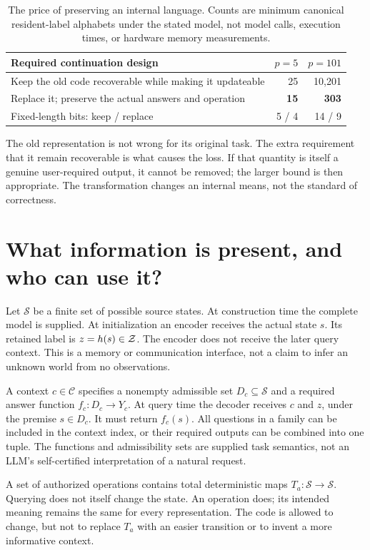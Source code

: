 \documentclass[11pt,letterpaper]{article}
\newcommand{\Sset}{\mathcal S}\newcommand{\Cset}{\mathcal C}
\theoremstyle{remark}\newtheorem{remark}{Remark}[section]
\begin{document}
\begin{table}[htbp]\centering\small
\caption{The price of preserving an internal language. Counts are minimum canonical resident-label alphabets under the stated model, not model calls, execution times, or hardware memory measurements.}\label{tab:opening}
\begin{tabularx}{\linewidth}{@{}Yrr@{}}\toprule
Required continuation design & $p=5$ & $p=101$\\\midrule
Keep the old code recoverable while making it updateable & 25 & 10,201\\
Replace it; preserve the actual answers and operation & \textbf{15} & \textbf{303}\\
Fixed-length bits: keep / replace & 5 / 4 & 14 / 9\\\bottomrule
\end{tabularx}
\end{table}

The old representation is not wrong for its original task. The extra requirement that it remain recoverable is what causes the loss. If that quantity is itself a genuine user-required output, it cannot be removed; the larger bound is then appropriate. The transformation changes an internal means, not the standard of correctness.

\section{What information is present, and who can use it?}
\label{sec:contract}
Let $\Sset$ be a finite set of possible source states. At construction time the complete model is supplied. At initialization an encoder receives the actual state $s$. Its retained label is $z=h(s)\in\mathcal Z$. The encoder does not receive the later query context. This is a memory or communication interface, not a claim to infer an unknown world from no observations.

A context $c\in\Cset$ specifies a nonempty admissible set $D_c\subseteq\Sset$ and a required answer function $f_c:D_c\to Y_c$. At query time the decoder receives $c$ and $z$, under the premise $s\in D_c$. It must return $f_c(s)$. All questions in a family can be included in the context index, or their required outputs can be combined into one tuple. The functions and admissibility sets are supplied task semantics, not an LLM's self-certified interpretation of a natural request.

A set of authorized operations contains total deterministic maps $T_a:\Sset\to\Sset$. Querying does not itself change the state. An operation does; its intended meaning remains the same for every representation. The code is allowed to change, but not to replace $T_a$ with an easier transition or to invent a more informative context.
\end{document}
